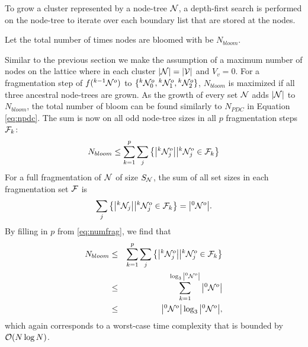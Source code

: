 To grow a cluster represented by a node-tree $\mathcal{N}$, a depth-first search is performed on the node-tree to iterate over each boundary list that are stored at the nodes. 
\begin{definition}\label{def:nbloom}
  Let the total number of times nodes are bloomed with  be $N_{bloom}$.
\end{definition}

Similar to the previous section we make the assumption of a maximum number of nodes on the lattice where in each cluster $|\mathcal{N}| = |\mathcal{V}|$ and $V_v = 0$. For a fragmentation step of $f({}^{k-1}\mathcal{N}^o)$ to $\{{}^{k}\mathcal{N}^o_0, {}^{k}\mathcal{N}^o_1, {}^{k}\mathcal{N}^o_2\}$, $N_{bloom}$ is maximized if all three ancestral node-trees are grown. As the growth of every set $\mathcal{N}$ adds $|\mathcal{N}|$ to $N_{bloom}$, the total number of bloom can be found similarly to $N_{PDC}$ in Equation \eqref{eq:npdc}. The sum is now on all odd node-tree sizes in all $p$ fragmentation steps $\mathcal{F}_k$: 
\begin{equation}\label{eq:nnode}
  N_{bloom} \leq \sum^{p}_{k=1}\sum_j \left\{ \abs{{}^{k}\mathcal{N}^o_j} \big| {}^{k}\mathcal{N}^o_j \in \mathcal{F}_k \right\}
\end{equation}
For a full fragmentation of $\mathcal{N}$ of size $S_{\mathcal{N}}$, the sum of all set sizes in each fragmentation set $\mathcal{F}$ is
\begin{equation}\label{eq:sumsetsfrag}
  \sum_j \left\{ \abs{{}^{k}\mathcal{N}_j} \big| {}^{k}\mathcal{N}^o_j \in \mathcal{F}_k \right\} = \abs{{}^{0}\mathcal{N}^o}.
\end{equation}
By filling in $p$ from \eqref{eq:numfrag}, we find that
\begin{eqnarray}
  \nonumber N_{bloom} &\leq& \sum^{p}_{k=1}\sum_j \left\{ \abs{{}^{k}\mathcal{N}^o_j} \big| {}^{k}\mathcal{N}^o_j \in \mathcal{F}_k \right\} \\
  \nonumber           &\leq& \sum_{k=1}^{\log_3{\abs{{}^{0}\mathcal{N}^o}}} \abs{{}^{0}\mathcal{N}^o} \\
                      &\leq& \abs{{}^{0}\mathcal{N}^o}\log_3{\abs{{}^{0}\mathcal{N}^o}},
\end{eqnarray}
which again corresponds to a worst-case time complexity that is bounded by $\mathcal{O}(N\log{N})$.

